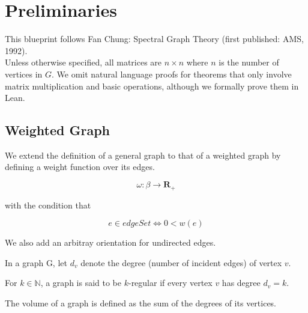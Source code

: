 \chapter{Preliminaries}

This blueprint follows Fan Chung: Spectral Graph Theory (first published: AMS, 1992).\\
Unless otherwise specified, all matrices are $n \times n$ where $n$ is the number of vertices in $G$.
We omit natural language proofs for theorems that only involve matrix multiplication and basic operations, although we formally prove them in Lean.

\section{Weighted Graph}

\begin{definition}
\label{def:UnweightedGraph}
\leanok
We extend the definition of a general graph to that of a weighted graph by defining a weight function over its edges.

\[
\omega : \beta \to \mathbf{R}_{+}
\]

with the condition that

\[
e \in edgeSet \iff 0 < w(e)
\]

We also add an arbitray orientation for undirected edges.

\end{definition}


\begin{definition}
\label{def:degree}    
\leanok
In a graph G, let $d_v$ denote the degree (number of incident edges) of vertex $v$.
\end{definition}



\begin{definition}
\label{def:IsRegularOfDegree}
\leanok
For $k \in \mathbb{N}$, a graph is said to be $k$-regular if every vertex $v$ has degree $d_v = k$.
\end{definition}


\begin{definition}
\label{def:graphVolume}
\leanok
The volume of a graph is defined as the sum of the degrees of its vertices.
\end{definition}



